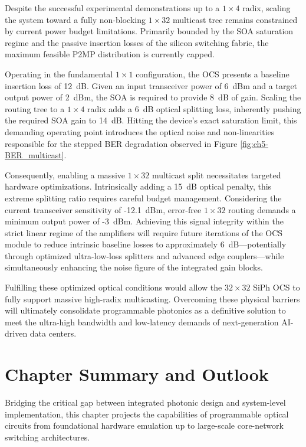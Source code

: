 Despite the successful experimental demonstrations up to a $1\times4$ radix, scaling the system 
toward a fully non-blocking $1\times32$ multicast tree remains constrained by current power budget 
limitations. Primarily bounded by the SOA saturation regime and the passive insertion losses of the 
silicon switching fabric, the maximum feasible P2MP distribution is currently capped. 

Operating in the fundamental $1\times1$ configuration, the OCS presents a baseline insertion loss 
of 12~dB. Given an input transceiver power of 6~dBm and a target output power of 2~dBm, the SOA is 
required to provide 8~dB of gain. Scaling the routing tree to a $1\times4$ radix adds a 6~dB 
optical splitting loss, inherently pushing the required SOA gain to 14~dB. Hitting the device's 
exact saturation limit, this demanding operating point introduces the optical noise and 
non-linearities responsible for the stepped BER degradation observed in Figure 
\ref{fig:ch5-BER_multicast}.

Consequently, enabling a massive $1\times32$ multicast split necessitates targeted hardware 
optimizations. Intrinsically adding a 15~dB optical penalty, this extreme splitting ratio requires 
careful budget management. Considering the current transceiver sensitivity of -12.1~dBm, 
error-free $1\times32$ routing demands a minimum output power of -3~dBm. Achieving this signal 
integrity within the strict linear regime of the amplifiers will require future iterations of the 
OCS module to reduce intrinsic baseline losses to approximately 6~dB—potentially through optimized 
ultra-low-loss splitters \cite{papadovasilakisFabricationTolerantOBandWDM2024} and advanced edge 
couplers—while simultaneously enhancing the noise figure of the integrated gain blocks. 

Fulfilling these optimized optical conditions would allow the $32\times32$ SiPh OCS to fully 
support massive high-radix multicasting. Overcoming these physical barriers will ultimately 
consolidate programmable photonics as a definitive solution to meet the ultra-high bandwidth and 
low-latency demands of next-generation AI-driven data centers.

\clearpage

\section{Chapter Summary and Outlook}
\label{sec:ch5_conclusions}

Bridging the critical gap between integrated photonic design and system-level implementation, this 
chapter projects the capabilities of programmable optical circuits from foundational hardware 
emulation up to large-scale core-network switching architectures. 

